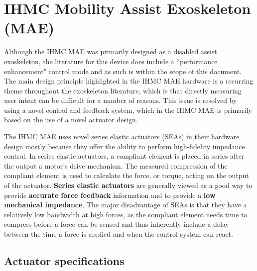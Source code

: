 



% 
\section{IHMC Mobility Assist Exoskeleton (MAE)}
Although the IHMC MAE was primarily designed as a disabled assist exoskeleton, the literature for this device does include a ``performance enhancement" control mode and as such is within the scope of this document.  The main design principle highlighted in the IHMC MAE hardware is a recurring theme throughout the exoskeleton literature, which is that directly measuring user intent can be difficult for a number of reasons.  This issue is resolved by using a novel control and feedback system, which in the IHMC MAE is primarily based on the use of a novel actuator design. 

The IHMC MAE uses novel series elastic actuators  (SEAs) in their hardware design mostly because they offer the ability to perform high-fidelity impedance control.  In series elastic actuators, a compliant element is placed in series after the output a motor's drive mechanism. The measured compression of the compliant element is used to calculate the force, or torque, acting on the output of the actuator.  { \bf Series elastic actuators} are generally viewed as a good way to provide {\bf accurate force feedback} information and to provide a {\bf low mechanical impedance}.  The major disadvantage of SEAs is that they have a relatively low bandwidth at high forces, as the compliant element needs time to compress before a force can be sensed and thus inherently include a delay between the time a force is applied and when the control system can react.

\subsection{Actuator specifications}

